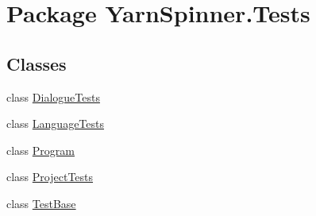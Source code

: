 \hypertarget{a00314}{\section{Package Yarn\-Spinner.\-Tests}
\label{a00314}
}
\subsection*{Classes}
\begin{DoxyCompactItemize}
\item 
class \hyperlink{a00074}{Dialogue\-Tests}
\item 
class \hyperlink{a00100}{Language\-Tests}
\item 
class \hyperlink{a00127}{Program}
\item 
class \hyperlink{a00130}{Project\-Tests}
\item 
class \hyperlink{a00146}{Test\-Base}
\end{DoxyCompactItemize}
